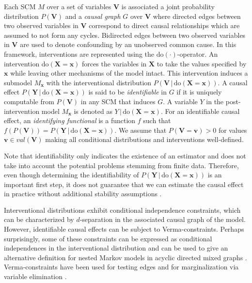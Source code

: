\documentclass{statsoc}
\newcommand{\+}[1]{\ensuremath{\mathbf{#1}}}
\newcommand{\doo}{\textrm{do}}
\newcommand{\given}{{ \, | \, }}
\begin{document}
Each SCM $M$ over a set of variables $\+ V$ is associated a joint probability distribution $P(\+V)$ and a \emph{causal graph} $G$ over $\+ V$ where directed edges between two observed variables in $\+ V$ correspond to direct causal relationships which are assumed to not form any cycles. Bidirected edges between two observed variables in $\+ V$ are used to denote confounding by an unobserved common cause. In this framework, interventions are represented using the $\doo(\cdot)$-operator. An intervention $\doo(\+ X = \+x)$ forces the variables in $\+ X$ to take the values specified by $\+ x$ while leaving other mechanisms of the model intact. This intervention induces a submodel $M_{\+ x}$ with the interventional distribution $P(\+ V \given \doo(\+ X = \+ x))$. A causal effect $P(\+ Y \given \doo(\+ X = \+ x))$ is said to be \emph{identifiable} in $G$ if it is uniquely computable from $P(\+ V)$ in any SCM that induces $G$. A variable $Y$ in the post-intervention model $M_{\+ x}$ is denoted as $Y \given \doo(\+ X = \+ x)$. For an identifiable causal effect, an \emph{identifying functional} is a function $f$ such that $f(P(\+ V)) = P(\+ Y \given \doo(\+ X = \+ x))$. We assume that $P(\+ V = \+ v) > 0$ for values $\+ v \in val(\+ V)$ making all conditional distributions and interventions well-defined. 

Note that identifiability only indicates the existence of an estimator and does not take into account the potential problems stemming from finite data. Therefore, even though determining the identifiability of $P(\+ Y \given \doo(\+ X = \+ x))$ is an important first step, it does not guarantee that we can estimate the causal effect in practice without additional stability assumptions \citep{maclaren2019}.

Interventional distributions exhibit conditional independence constraints, which can be characterized by $d$-separation \citep{Pearl88} in the associated causal graph of the model. However, identifiable causal effects can be subject to Verma-constraints. Perhaps surprisingly, some of these constraints can be expressed as conditional independences in the interventional distribution \citep{ShpitserPearlDormant} and can be used to give an alternative definition for nested Markov models in acyclic directed mixed graphs \citep{richardson2012}. 
Verma-constraints have been used for testing edges \citep{Shpitser2009} and for marginalization via variable elimination \citep{Shpitser2011}. 
\end{document}
